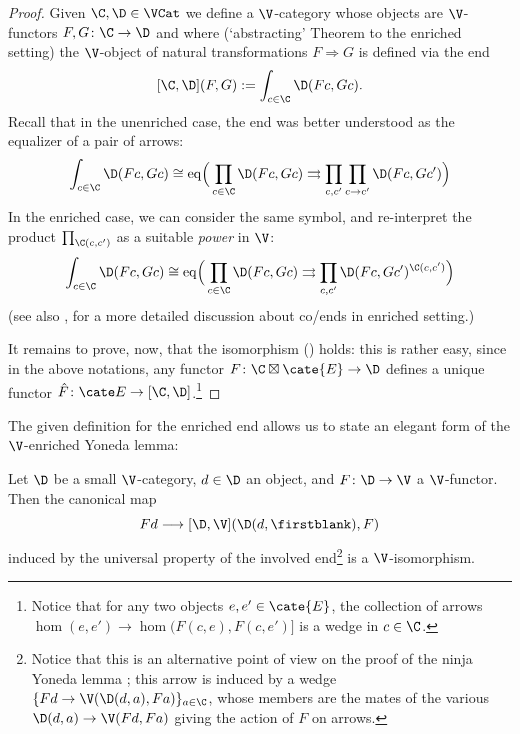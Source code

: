 \begin{proof}
Given $\C,\D\in \VCat$ we define a $\V$-category whose objects are $\V$-functors $F,G\colon \C\to\D$ and where (`abstracting' Theorem  to the enriched setting) the $\V$-object of natural transformations $F\Rightarrow G$ is defined via the end
\[
[\C,\D](F,G) := \int_{c\in\C} \D(Fc,Gc).
\]
Recall that in the unenriched case, the end was better understood as the equalizer of a pair of arrows:
\[
\int_{c\in\C}\D(Fc,Gc)\cong {\rm eq}\Big( \prod_{c\in \C}\D(Fc,Gc)\rightrightarrows \prod_{c,c'}\prod_{c\to c'}\D(Fc,Gc') \Big)
\]
In the enriched case, we can consider the same symbol, and re-interpret the product $\prod_{\C(c,c')}$ as a suitable \emph{power} in $\V$:
\[
\int_{c\in\C}\D(Fc,Gc)\cong {\rm eq}\Big( \prod_{c\in \C}\D(Fc,Gc)\rightrightarrows \prod_{c,c'} \D(Fc,Gc')^{\C(c,c')}\Big)
\]
(see also \cite[\S \textbf{2.3}]{Gray1980}, \cite{dubuc1970kan} for a more detailed discussion about co/ends in enriched setting.)

It remains to prove, now, that the isomorphism () holds: this is rather easy, since in the above notations, any functor $F\colon \C\boxtimes \cate{E} \to \D$ defines a unique functor $\hat F\colon \cate E \to [\C,\D]$.\footnote{Notice that for any two objects $e,e'\in\cate{E}$, the collection of arrows $\hom(e,e') \to \hom(F(c,e) , F(c,e')]$ is a wedge in $c\in\C$.}
\end{proof}
The given definition for the enriched end allows us to state an elegant form of the $\V$-enriched Yoneda lemma:
\begin{remark}
Let $\D$ be a small $\V$-category, $d\in\D$ an object, and $F\colon \D\to\V$ a $\V$-functor. Then the canonical map
\[
Fd\longrightarrow [\D,\V](\D(d,\firstblank),F)
\]
induced by the universal property of the involved end\footnote{Notice that this is an alternative point of view on the proof of the ninja Yoneda lemma ; this arrow is induced by a wedge $\{Fd\to \V(\D(d,a), Fa)\}_{a\in\C}$, whose members are the mates of the various $\D(d,a)\to \V(Fd,Fa)$ giving the action of $F$ on arrows.} is a $\V$-isomorphism.
\end{remark}
